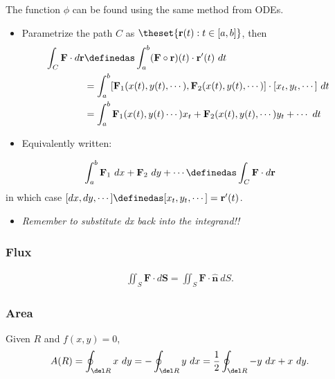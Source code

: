 The function \(\phi\) can be found using the same method from ODEs.

\begin{itemize}
\item
  Parametrize the path \(C\) as \(\theset{\mathbf{r}(t): t\in[a,b]}\),
  then
  \begin{align*}
  \int_C \mathbf F \cdot d\mathbf r
  & \definedas \int_a^b (\mathbf F \circ \mathbf r)(t) \cdot \mathbf r'(t) ~dt \\
  &= \int_a^b [\mathbf F_1(x(t), y(t), \cdots), \mathbf F_2(x(t), y(t), \cdots)]\cdot[x_t, y_t, \cdots] ~dt \\
  &= \int_a^b \mathbf F_1(x(t), y(t) \cdots)x_t + \mathbf F_2(x(t), y(t), \cdots)y_t + \cdots ~dt
  \end{align*}
\item
  Equivalently written:
\end{itemize}

\begin{align*}
\int_a^b \mathbf F_1 ~dx + \mathbf F_2 ~dy + \cdots
\definedas \int_C \mathbf F \cdot d\mathbf r
\end{align*} in which case
\([dx, dy, \cdots] \definedas [x_t, y_t, \cdots] = \mathbf r'(t)\).

\begin{itemize}
\tightlist
\item
  \emph{Remember to substitute dx back into the integrand!!}
\end{itemize}

\hypertarget{flux}{%
\subsubsection{Flux}\label{flux}}

\begin{align*}  
\iint_S \mathbf{F}\cdot d\mathbf{S} = \iint_S \mathbf{F}\cdot \mathbf{\hat n} ~dS
.\end{align*}

\hypertarget{area}{%
\subsubsection{Area}\label{area}}

\begin{proposition}

Given \(R\) and \(f(x,y) = 0\),
\begin{align*}  
A(R) = \oint _ { \del R } x ~d y = - \oint _ { \del R } y ~d x = \frac { 1 } { 2 } \oint _ { \del R } - y ~d x + x ~d y
.
\end{align*}

\end{proposition}

